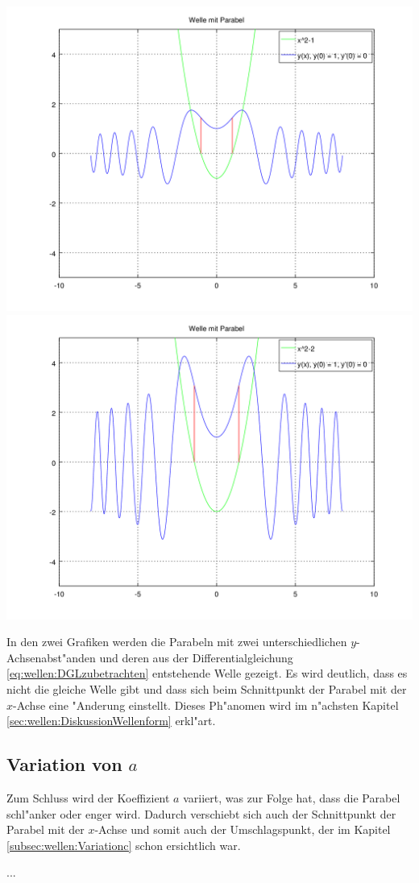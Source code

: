 \noindent
\includegraphics[scale=0.35]{./wellen/images/varc/cneg1.png}
\includegraphics[scale=0.35]{./wellen/images/varc/cneg2.png}

In den zwei Grafiken werden die 
Parabeln mit zwei unterschiedlichen $y$-Achsenabst"anden und deren aus der 
Differentialgleichung \ref{eq:wellen:DGLzubetrachten} entstehende Welle 
gezeigt. 
Es wird deutlich, dass es nicht die gleiche Welle gibt und dass sich beim 
Schnittpunkt der Parabel mit der $x$-Achse eine "Anderung einstellt. Dieses 
Ph"anomen wird im n"achsten Kapitel \ref{sec:wellen:DiskussionWellenform} 
erkl"art. 

\subsection{Variation von \texorpdfstring{$a$}{a}}
\label{subsec:wellen:Variationa}

Zum Schluss wird der Koeffizient $a$ variiert, was zur Folge hat, dass die 
Parabel schl"anker oder enger wird. Dadurch verschiebt sich auch der 
Schnittpunkt der Parabel mit der $x$-Achse und somit auch der Umschlagspunkt, 
der im Kapitel \ref{subsec:wellen:Variationc} schon ersichtlich war. 

...